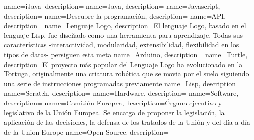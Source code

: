 
%





{
        name=iJava,
        description={}
}
{
        name=Java,
        description={}
}
{
        name=Javascript,
        description={}
}
{
        name=Descubre la programación,
        description={}
}
{
        name=API,
        description={}
}
{
        name=Lenguaje Logo,
        description={El lenguaje Logo, basado en el lenguaje Lisp, fue diseñado como una herramienta para aprendizaje. Todas sus características -interactividad, modularidad, extensibilidad, flexibilidad en los tipos de datos- persiguen esta meta}
}
{
        name=Arduino,
        description={}
}
{
        name=Turtle,
        description={El proyecto más popular del Lenguaje Logo ha evolucionado en la Tortuga, originalmente una criatura robótica que se movia por el suelo siguiendo una serie de instrucciones programadas previamente}
}
{
        name=Lisp,
        description={}
}
{
        name=Scratch,
        description={}
}
{
        name=Hardware,
        description={}
}
{
        name=Software,
        description={}
}
{
        name=Comisión Europea,
        description={Órgano ejecutivo y legislativo de la Unión Europea. Se encarga de proponer la legislación, la aplicación de las decisiones, la defensa de los tratados de la Unión y del día a día de la Union Europe}
}
{
        name=Open Source,
        description={}
}
